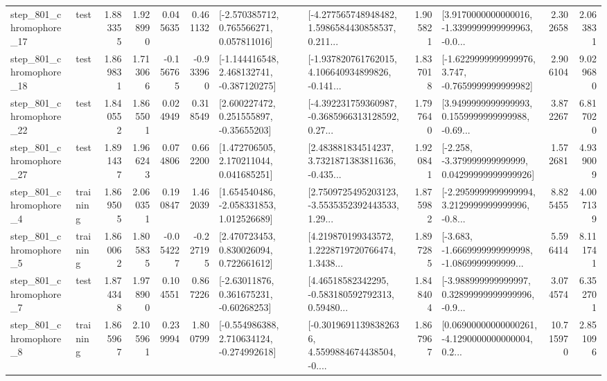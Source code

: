 \begin{tabular}{llrrrrllrlrr}
  step\_801\_chromophore\_17 &      test &      1.883355 &    1.928990 &      0.045635 &  0.461132 &    [-2.570385712, 0.765566271, 0.057811016] &  [-4.277565748948482, 1.5986584430858537, 0.211... &       1.905821 &  [3.9170000000000016, -1.3399999999999963, -0.0... &            2.302658 &          2.063831 \\
  step\_801\_chromophore\_18 &      test &      1.869831 &    1.713066 &     -0.156765 & -0.933960 &   [-1.144416548, 2.468132741, -0.387120275] &  [-1.937820761762015, 4.106640934899826, -0.141... &       1.837018 &  [-1.6229999999999976, 3.747, -0.7659999999999982] &            2.906104 &          9.029680 \\
  step\_801\_chromophore\_22 &      test &      1.840552 &    1.865501 &      0.024949 &  0.318549 &     [2.600227472, 0.251555897, -0.35655203] &  [-4.392231759360987, -0.3685966313128592, 0.27... &       1.797640 &  [3.9499999999999993, 0.1559999999999988, -0.69... &            3.872267 &          6.817020 \\
  step\_801\_chromophore\_27 &      test &      1.891437 &    1.966243 &      0.074806 &  0.662200 &     [1.472706505, 2.170211044, 0.041685251] &  [2.483881834514237, 3.7321871383811636, -0.435... &       1.920841 &  [-2.258, -3.379999999999999, 0.04299999999999926] &            1.572681 &          4.939009 \\
   step\_801\_chromophore\_4 &  training &      1.869505 &    2.060351 &      0.190847 &  1.462039 &    [1.654540486, -2.058331853, 1.012526689] &  [2.7509725495203123, -3.5535352392443533, 1.29... &       1.875982 &  [-2.2959999999999994, 3.2129999999999996, -0.8... &            8.825455 &          4.007139 \\
   step\_801\_chromophore\_5 &  training &      1.860062 &    1.805835 &     -0.054227 & -0.227195 &     [2.470723453, 0.830026094, 0.722661612] &  [4.219870199343572, 1.2228719720766474, 1.3438... &       1.897285 &  [-3.683, -1.6669999999999998, -1.0869999999999... &            5.596414 &          8.111741 \\
   step\_801\_chromophore\_7 &      test &      1.874348 &    1.978900 &      0.104551 &  0.867226 &     [-2.63011876, 0.361675231, -0.60268253] &  [4.46518582342295, -0.583180592792313, 0.59480... &       1.848404 &  [-3.988999999999997, 0.32899999999999996, -0.9... &            3.074574 &          6.352701 \\
   step\_801\_chromophore\_8 &  training &      1.865967 &    2.105961 &      0.239994 &  1.800799 &   [-0.554986388, 2.710634124, -0.274992618] &  [-0.30196911398382636, 4.5599884674438504, -0.... &       1.867967 &  [0.06900000000000261, -4.1290000000000004, 0.2... &           10.715970 &          2.851096 \\

\end{tabular}
